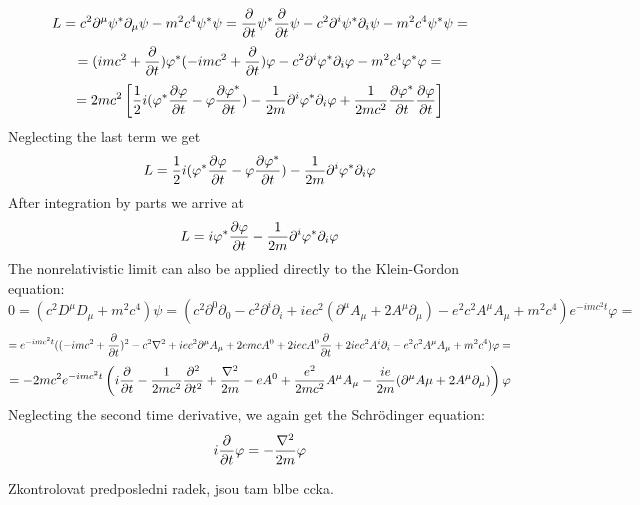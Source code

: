 $$L=c^2\partial^\mu\psi^*\partial_\mu\psi-m^2c^4\psi^*\psi=
{\partial\over\partial t}\psi^*{\partial\over\partial t}\psi
-c^2\partial^i\psi^*\partial_i\psi-m^2c^4\psi^*\psi=$$
$$=(imc^2+{\partial\over\partial t})\varphi^*
(-imc^2+{\partial\over\partial t})\varphi
-c^2\partial^i\varphi^*\partial_i\varphi-m^2c^4\varphi^*\varphi=$$
$$=2mc^2\left[{1\over2}i(\varphi^*{\partial\varphi\over\partial t}-
\varphi{\partial\varphi^*\over\partial t})-
{1\over2m}\partial^i\varphi^*\partial_i\varphi
+{1\over2mc^2}{\partial\varphi^*\over\partial t}
{\partial\varphi\over\partial t}\right]$$
Neglecting the last term we get
$$L={1\over2}i(\varphi^*{\partial\varphi\over\partial t}-
\varphi{\partial\varphi^*\over\partial t})-
{1\over2m}\partial^i\varphi^*\partial_i\varphi
$$
After integration by parts we arrive at
$$L=i\varphi^*{\partial\varphi\over\partial t}
-{1\over 2m}\partial^i\varphi^*\partial_i
\varphi$$
The nonrelativistic limit can also be applied directly to the Klein-Gordon equation:
$$0=(c^2D^\mu D_\mu+m^2c^4)\psi=
(c^2\partial^0\partial_0-c^2\partial^i\partial_i+iec^2(\partial^\mu
A_\mu+2A^\mu\partial_\mu) -e^2c^2A^\mu A_\mu+m^2c^4)e^{-imc^2t}\varphi=$$
$$=e^{-imc^2t}((-imc^2+{\partial\over\partial t})^2-c^2\nabla^2
+iec^2\partial^\mu A_\mu+2emcA^0+2iec A^0{\partial\over\partial
t}+2iec^2A^i\partial_i-e^2c^2 A^\mu A_\mu
+m^2c^4)\varphi=$$
$$=
-2mc^2e^{-imc^2t}\left(i{\partial\over\partial
t}-{1\over2mc^2}{\partial^2\over\partial t^2}+{\nabla^2\over2m}
-eA^0+{e^2\over2mc^2}A^\mu A_\mu
-{ie\over2m}(\partial^\mu A\mu+2A^\mu\partial_\mu)
\right)\varphi$$
Neglecting the second time derivative, we again get the Schr\"odinger equation:
$$i{\partial\over\partial t}\varphi=-{\nabla^2\over2 m}\varphi$$

Zkontrolovat predposledni radek, jsou tam blbe ccka.
